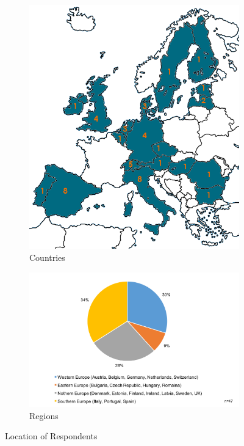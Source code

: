 \documentclass[11pt]{amsart}
\begin{document}
\begin{figure}[h]
\centering
\begin{subfigure}{.5\textwidth}
  \centering
  \includegraphics[width=\linewidth]{charts/map.png}
  \caption{Countries}
  \label{fig:map}
\end{subfigure}%
\begin{subfigure}{.5\textwidth}
  \centering
  \includegraphics[width=1.5\linewidth]{charts/where.png}
   \caption{Regions}
  \label{fig:members}
\end{subfigure}
\caption{Location of Respondents}
\label{fig:mapandmembers}
\end{figure}
\end{document}
